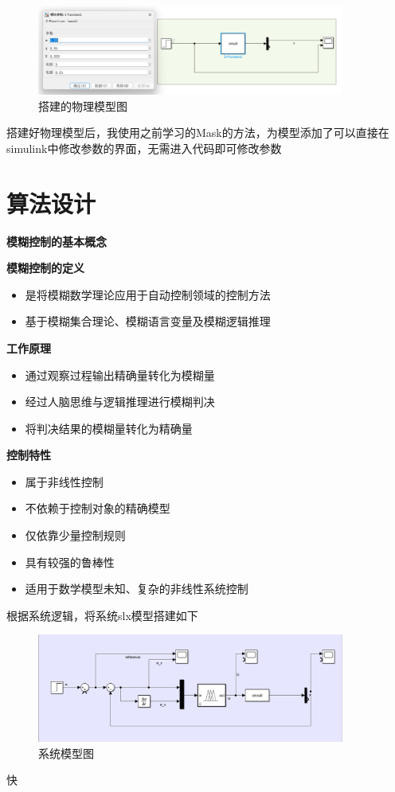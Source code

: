 \documentclass[12pt,a4paper,UTF8]{article}
\begin{document}
\begin{figure}[htbp] \centering \includegraphics[width=0.9\textwidth]{figures/2024-12-13-21-34-23.png} \caption{搭建的物理模型图}  \end{figure}

搭建好物理模型后，我使用之前学习的Mask的方法，为模型添加了可以直接在simulink中修改参数的界面，无需进入代码即可修改参数


\clearpage %
\section{算法设计}



\textbf{模糊控制的基本概念}

\textbf{模糊控制的定义}
\begin{itemize}
    \item 是将模糊数学理论应用于自动控制领域的控制方法
    \item 基于模糊集合理论、模糊语言变量及模糊逻辑推理
\end{itemize}

\textbf{工作原理}
\begin{itemize}
    \item 通过观察过程输出精确量转化为模糊量
    \item 经过人脑思维与逻辑推理进行模糊判决
    \item 将判决结果的模糊量转化为精确量
\end{itemize}

\textbf{控制特性}
\begin{itemize}
    \item 属于非线性控制
    \item 不依赖于控制对象的精确模型
    \item 仅依靠少量控制规则
    \item 具有较强的鲁棒性
    \item 适用于数学模型未知、复杂的非线性系统控制
\end{itemize}

根据系统逻辑，将系统slx模型搭建如下

\begin{figure}[htbp] \centering \includegraphics[width=0.9\textwidth]{figures/2024-12-13-21-31-56.png} \caption{系统模型图}\end{figure}
快
\end{document}
